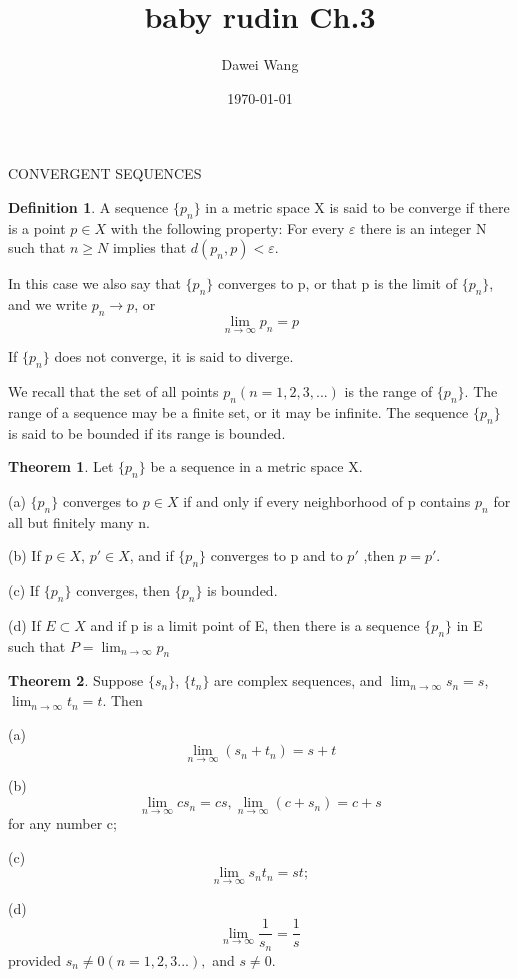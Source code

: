 \documentclass{article}
\date{\today}
\title{baby rudin Ch.3}
\author{Dawei Wang}
\theoremstyle{definition}
\newtheorem{defi}{Definition}
\newtheorem{theo}{Theorem}
\theoremstyle{remark}
\begin{document}
	\maketitle
	
CONVERGENT SEQUENCES

\begin{defi}
	A sequence $\{p_n\}$ in a metric space X is said to be converge if there is a point $p\in X$ with the following property: For every $\varepsilon$ there is an integer N such that $n\ge N$ implies that $d(p_n,p)<\varepsilon$.
\end{defi}
	In this case we also say that $\{ p_n\}$ converges to p, or that p is the limit of $\{p_n\}$, and we write $p_n\rightarrow p$, or 
	\[
	\lim_{n\rightarrow\infty}p_n=p
	\]
	
	If $\{p_n\}$ does not converge, it is said to diverge.
	
	We recall that the set of all points $p_n(n=1,2,3,...)$ is the range of $\{p_n\}$. The range of a sequence may be a finite set, or it may be infinite. The sequence $\{p_n\}$ is said to be bounded if its range is bounded. 
	
\begin{theo}
	Let $\{p_n\}$ be a sequence in a metric space X.
	
	(a) $\{p_n\}$ converges to $p\in X$ if and only if every neighborhood of p contains $p_n$ for all but finitely many n.
	
	(b) If $p\in X$, $p'\in X$, and if $\{p_n\}$ converges to p and to $p'$ ,then $p=p'$.
	
	(c) If $\{p_n\}$ converges, then $\{p_n\}$ is bounded.
	
	(d) If $E\subset X$ and if p is a limit point of E, then there is a sequence $\{p_n\}$ in E such that $P=\lim_{n\rightarrow\infty}p_n$ 
\end{theo}
	
\begin{theo}
	Suppose $\{s_n\}$, $\{t_n\}$ are complex sequences, and $\lim_{n\rightarrow\infty} s_n=s$, $\lim_{n\rightarrow\infty} t_n=t$. Then
	
	(a) 
	\[ \lim_{n\rightarrow\infty}(s_n+t_n)=s+t	\]
	
	(b) 
	\[ \lim_{n\rightarrow\infty}cs_n=cs, \lim_{n\rightarrow\infty}(c+s_n)=c+s	\] 
	for any number c;
	
	(c)
	\[
	\lim_{n\rightarrow\infty}s_nt_n=st;
	\]
	
	(d)
	\[
	\lim_{n\rightarrow\infty}\frac{1}{s_n}=\frac{1}{s}
	\]
	provided $s_n\ne 0(n=1,2,3...),$ and $s\ne0$.
	
\end{theo}
	
\end{document}
